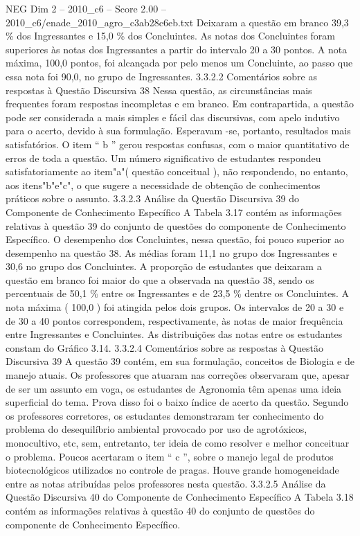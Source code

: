 \begin{textsample}{NEG Dim 2 – 2010\_c6 – Score 2.00 – 2010\_c6/enade\_2010\_agro\_c3ab28c6eb.txt}
Deixaram a questão em branco 39,3 \% dos Ingressantes e 15,0 \% dos Concluintes.
As notas dos Concluintes foram superiores às notas dos Ingressantes a partir do intervalo 20 a 30 pontos.
A nota máxima, 100,0 pontos, foi alcançada por pelo menos um Concluinte, ao passo que essa nota foi 90,0, no grupo de Ingressantes. 3.3.2.2 Comentários sobre as respostas à Questão Discursiva 38 Nessa questão, as circunstâncias mais frequentes foram respostas incompletas e em branco.
Em contrapartida, a questão pode ser considerada a mais simples e fácil das discursivas, com apelo indutivo para o acerto, devido à sua formulação.
Esperavam -se, portanto, resultados mais satisfatórios.
O item “ b ” gerou respostas confusas, com o maior quantitativo de erros de toda a questão.
Um número significativo de estudantes respondeu satisfatoriamente ao item"a"( questão conceitual ), não respondendo, no entanto, aos itens"b"e"c", o que sugere a necessidade de obtenção de conhecimentos práticos sobre o assunto. 3.3.2.3 Análise da Questão Discursiva 39 do Componente de Conhecimento Específico A Tabela 3.17 contém as informações relativas à questão 39 do conjunto de questões do componente de Conhecimento Específico.
O desempenho dos Concluintes, nessa questão, foi pouco superior ao desempenho na questão 38.
As médias foram 11,1 no grupo dos Ingressantes e 30,6 no grupo dos Concluintes.
A proporção de estudantes que deixaram a questão em branco foi maior do que a observada na questão 38, sendo os percentuais de 50,1 \% entre os Ingressantes e de 23,5 \% dentre os Concluintes.
A nota máxima ( 100,0 ) foi atingida pelos dois grupos.
Os intervalos de 20 a 30 e de 30 a 40 pontos correspondem, respectivamente, às notas de maior frequência entre Ingressantes e Concluintes.
As distribuições das notas entre os estudantes constam do Gráfico 3.14. 3.3.2.4 Comentários sobre as respostas à Questão Discursiva 39 A questão 39 contém, em sua formulação, conceitos de Biologia e de manejo atuais.
Os professores que atuaram nas correções observaram que, apesar de ser um assunto em voga, os estudantes de Agronomia têm apenas uma ideia superficial do tema.
Prova disso foi o baixo índice de acerto da questão.
Segundo os professores corretores, os estudantes demonstraram ter conhecimento do problema do desequilíbrio ambiental provocado por uso de agrotóxicos, monocultivo, etc, sem, entretanto, ter ideia de como resolver e melhor conceituar o problema.
Poucos acertaram o item “ c ”, sobre o manejo legal de produtos biotecnológicos utilizados no controle de pragas.
Houve grande homogeneidade entre as notas atribuídas pelos professores nesta questão. 3.3.2.5 Análise da Questão Discursiva 40 do Componente de Conhecimento Específico A Tabela 3.18 contém as informações relativas à questão 40 do conjunto de questões do componente de Conhecimento Específico.

\end{textsample}
